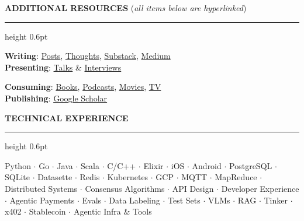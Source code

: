 \documentclass[10pt]{resume}
\newenvironment{rSectionCompact}[1]{
  \medskip
  \vspace{0.5em}
  \textbf{\textcolor{Cerulean}{\MakeUppercase{#1}}}
  \vspace{0.3em}
  {\color{Blue}\hrule height 0.6pt}
  \vspace{0.6em}
  \begin{list}{}{
    \setlength{\leftmargin}{0em}
  }
  \item[]
}{
    \vspace{0.35em}
    \end{list}
}
\begin{document}

\medskip
\vspace{0.9em}
\textbf{\textcolor{Cerulean}{\MakeUppercase{Additional Resources}}} (\textit{\small all items below are hyperlinked})
\vspace{0.3em}
{\color{Blue}\hrule height 0.6pt}
\vspace{0.85em}
\small
\noindent
\begin{minipage}[t]{0.62\linewidth}
    \textbf{Writing}: \href{https://olshansky.info/posts}{Posts}, \href{https://olshansky.info/thoughts}{Thoughts}, \href{https://olshansky.substack.com}{Substack}, \href{https://olshansky.medium.com}{Medium} \\
    \textbf{Presenting}: \href{https://www.youtube.com/playlist?list=PLeHvNSh0enXSflgNf-YC6jW6K3Fh4cS5E}{Talks} \& \href{https://www.youtube.com/playlist?list=PLeHvNSh0enXSflgNf-YC6jW6K3Fh4cS5E}{Interviews}
\end{minipage}%
\begin{minipage}[t]{0.38\linewidth}
    \textbf{Consuming}: \href{https://olshansky.info/book}{Books}, \href{https://olshansky.notion.site/768504560fd54cdaa7e24b6c3f31a21e}{Podcasts}, \href{https://olshansky.info/movie}{Movies}, \href{https://olshansky.info/tv}{TV} \\
    \textbf{Publishing}: \href{https://scholar.google.com/citations?user=pkPj80UAAAAJ&hl=en&oi=sra}{Google Scholar}
\end{minipage}


\begin{rSectionCompact}{Technical Experience}
    \small
    Python $\cdot$ Go $\cdot$ Java $\cdot$ Scala $\cdot$ C/C++ $\cdot$ Elixir $\cdot$ iOS $\cdot$ Android $\cdot$ PostgreSQL $\cdot$ SQLite $\cdot$ Datasette $\cdot$ Redis $\cdot$ Kubernetes $\cdot$ GCP $\cdot$ MQTT $\cdot$ MapReduce $\cdot$ Distributed Systems $\cdot$ Consensus Algorithms $\cdot$ API Design $\cdot$ Developer Experience $\cdot$ Agentic Payments $\cdot$ Evals $\cdot$ Data Labeling $\cdot$ Test Sets $\cdot$ VLMs $\cdot$ RAG $\cdot$ Tinker $\cdot$ x402 $\cdot$ Stablecoin $\cdot$ Agentic Infra \& Tools
\end{rSectionCompact}
\end{document}
